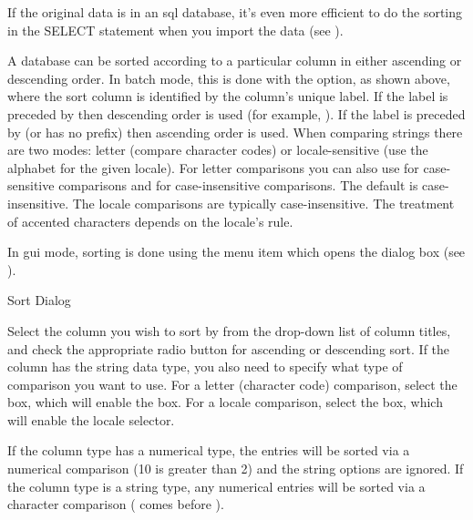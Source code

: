 \begin{information}
If the original data is in an \gls{sql} database, it's even more efficient to 
do the sorting in the SELECT statement when you import the data (see 
).
\end{information}

A database can be sorted according to a particular column
in either ascending or descending order. In batch mode, this is done
with the  option, as shown above, where the sort column is identified
by the column's unique label. If the label is preceded by \code{-} then
descending order is used (for example, ). If the label is preceded by \code{+} (or has
no prefix) then ascending order is used. When comparing strings there are 
two modes: letter (compare character codes) or locale-sensitive
(use the alphabet for the given locale).
For letter comparisons you 
can also use  for case-sensitive comparisons
and  for case-insensitive comparisons.
The default is case-insensitive. The locale comparisons are
typically case-insensitive. The treatment of accented characters depends
on the locale's rule.

In \gls{gui} mode, sorting is
done using the  menu item which opens
the  dialog box (see ).

 {%
 }
 {Sort Dialog}

Select the column you wish to sort by from the drop-down list of column
titles, and check the appropriate radio button for ascending or descending
sort. If the column has the string data type, you also need to specify
what type of comparison you want to use. For a letter (character code)
comparison, select the  box, which will enable
the  box. For a locale comparison,
select the  box, which will enable the
locale selector.

If the column type has a numerical type, the entries will be sorted via 
a numerical comparison (10 is greater than 2) and the string
options are ignored. If the column type is a string type,
any numerical entries will be sorted via a character comparison (
comes before ).

